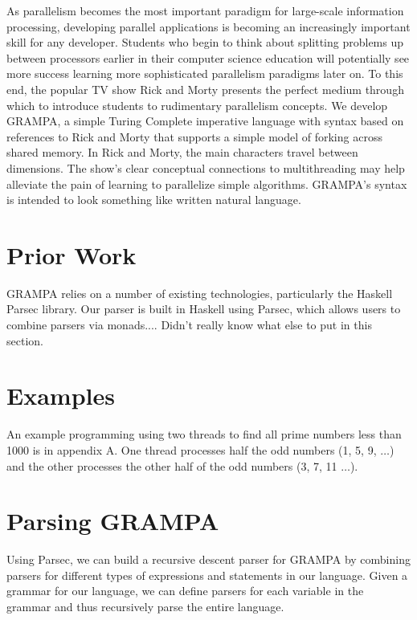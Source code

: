 \documentclass[preprint]{sigplanconf}
\begin{document}
As parallelism becomes the most important paradigm for large-scale information processing, developing parallel applications is becoming an increasingly important skill for any developer. Students who begin to think about splitting problems up between processors earlier in their computer science education will potentially see more success learning more sophisticated parallelism paradigms later on. To this end, the popular TV show Rick and Morty presents the perfect medium through which to introduce students to rudimentary parallelism concepts. We develop GRAMPA, a simple Turing Complete imperative language with syntax based on references to Rick and Morty that supports a simple model of forking across shared memory. In Rick and Morty, the main characters travel between dimensions. The show's clear conceptual connections to multithreading may help alleviate the pain of learning to parallelize simple algorithms. GRAMPA's syntax is intended to look something like written natural language.

\section{Prior Work}

GRAMPA relies on a number of existing technologies, particularly the Haskell Parsec library. Our parser is built in Haskell using Parsec, which allows users to combine parsers via monads.... Didn't really know what else to put in this section.

\section{Examples}
An example programming using two threads to find all prime numbers less than 1000 is in appendix A. One thread processes half the odd numbers (1, 5, 9, $\ldots$) and the other processes the other half of the odd numbers (3, 7, 11 $\ldots$). 

\section{Parsing GRAMPA}

Using Parsec, we can build a recursive descent parser for GRAMPA by combining parsers for different types of expressions and statements in our language. Given a grammar for our language, we can define parsers for each variable in the grammar and thus recursively parse the entire language.
\end{document}
